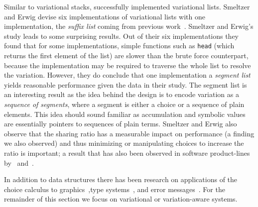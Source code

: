 Similar to variational stacks, \citet{SE17fosd} successfully implemented
variational lists. Smeltzer and Erwig devise six implementations of variational
lists with one implementation, the \emph{suffix list} coming from previous
work~\cite{EW11gttse}. Smeltzer and Erwig's study leads to some surprising
results. Out of their six implementations they found that for some
implementations, simple functions such as \texttt{head} (which returns the first
element of the list) are slower than the brute force counterpart, because the
implementation may be required to traverse the whole list to resolve the
variation. However, they do conclude that one implementation a \emph{segment
  list} yields reasonable performance given the data in their study. The segment
list is an interesting result as the idea behind the design is to encode
variation as a \emph{sequence of segments}, where a segment is either a choice
or a sequence of plain elements. This idea should sound familiar as accumulation
and symbolic values are essentially pointers to sequences of plain terms.
Smeltzer and Erwig also observe that the sharing ratio has a measurable impact
on performance (a finding we also observed) and thus minimizing or manipulating
choices to increase the ratio is important; a result that has also been observed
in software product-lines by~\citet{ARW+:ICSE13} and~\citet{KRE+:FOSD12}.

In addition to data structures there has been research on applications of the
choice calculus to graphics~\citep{ES18diagrams},type
systems~\citep{CCEW18popl,CCW18icfp,CEW:TOPLAS14,CEW12icfp}, and error
messages~\citep{CES17jvlc,CE14popl,CEW12icfp,CES14hcc}. For the remainder of
this section we focus on variational or variation-aware systems.

